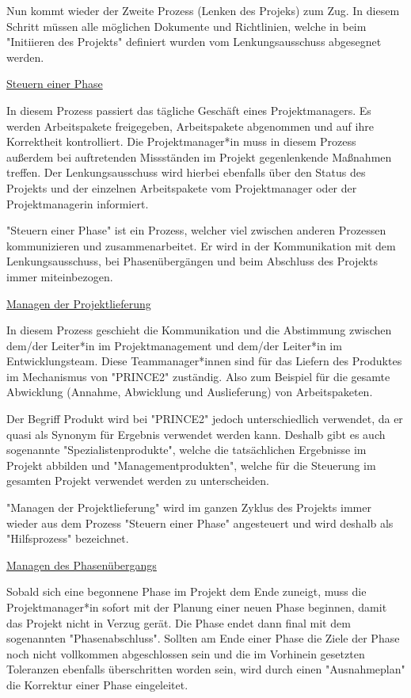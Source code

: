 Nun kommt wieder der Zweite Prozess (Lenken des Projeks) zum Zug. In diesem Schritt müssen alle möglichen Dokumente und Richtlinien, welche in beim "Initiieren des Projekts" definiert wurden vom Lenkungsausschuss abgesegnet werden. \cite{Prince2}

\underline{Steuern einer Phase}

In diesem Prozess passiert das tägliche Geschäft eines Projektmanagers. Es werden Arbeitspakete freigegeben, Arbeitspakete abgenommen und auf ihre Korrektheit kontrolliert. Die Projektmanager*in muss in diesem Prozess außerdem bei auftretenden Missständen im Projekt gegenlenkende Maßnahmen treffen. Der Lenkungsausschuss wird hierbei ebenfalls über den Status des Projekts und der einzelnen Arbeitspakete vom Projektmanager oder der Projektmanagerin informiert. \cite{Prince2}

"Steuern einer Phase" ist ein Prozess, welcher viel zwischen anderen Prozessen kommunizieren und zusammenarbeitet. Er wird in der Kommunikation mit dem Lenkungsausschuss, bei Phasenübergängen und beim Abschluss des Projekts immer miteinbezogen. \cite{Prince2}

\underline{Managen der Projektlieferung}

In diesem Prozess geschieht die Kommunikation und die Abstimmung zwischen dem/der Leiter*in im Projektmanagement und dem/der Leiter*in im Entwicklungsteam. Diese Teammanager*innen sind für das Liefern des Produktes im Mechanismus von "PRINCE2" zuständig. Also zum Beispiel für die gesamte Abwicklung (Annahme, Abwicklung und Auslieferung) von Arbeitspaketen. \cite{Prince2}

Der Begriff Produkt wird bei "PRINCE2" jedoch unterschiedlich verwendet, da er quasi als Synonym für Ergebnis verwendet werden kann. Deshalb gibt es auch sogenannte "Spezialistenprodukte", welche die tatsächlichen Ergebnisse im Projekt abbilden und "Managementprodukten", welche für die Steuerung im gesamten Projekt verwendet werden zu unterscheiden. \cite{Prince2}

"Managen der Projektlieferung" wird im ganzen Zyklus des Projekts immer wieder aus dem Prozess "Steuern einer Phase" angesteuert und wird deshalb als "Hilfsprozess" bezeichnet. \cite{Prince2}

\underline{Managen des Phasenübergangs}

Sobald sich eine begonnene Phase im Projekt dem Ende zuneigt, muss die Projektmanager*in sofort mit der Planung einer neuen Phase beginnen, damit das Projekt nicht in Verzug gerät. Die Phase endet dann final mit dem sogenannten "Phasenabschluss". Sollten am Ende einer Phase die Ziele der Phase noch nicht vollkommen abgeschlossen sein und die im Vorhinein gesetzten Toleranzen ebenfalls überschritten worden sein, wird durch einen "Ausnahmeplan" die Korrektur einer Phase eingeleitet. \cite{Prince2}

